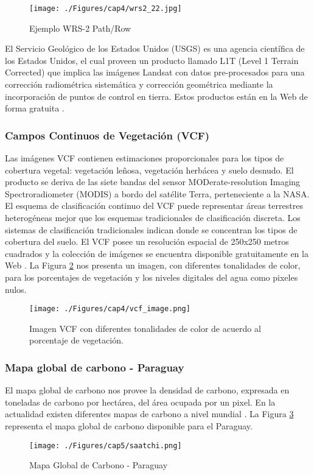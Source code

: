 \begin{figure}[H]
	\centering
	\texttt{[image: ./Figures/cap4/wrs2\_22.jpg]}
	\caption{Ejemplo WRS-2 Path/Row}
	\label{fig:wrs2Image}
\end{figure}

El Servicio Geol\'ogico de los Estados Unidos (USGS) es una agencia cient\'ifica de los Estados Unidos, el cual proveen un producto llamado L1T (Level 1 Terrain Corrected) que implica las im\'agenes Landsat con datos pre-procesados para una correcci\'on radiom\'etrica sistem\'atica y correcci\'on geom\'etrica mediante la incorporaci\'on de puntos de control en tierra. Estos productos est\'an en la Web de forma gratuita \cite{landsatNasa}.


\subsubsection{Campos Continuos de Vegetación (VCF)}\label{sec:vcf}
Las im\'agenes VCF contienen estimaciones proporcionales para los tipos de cobertura vegetal: vegetaci\'on le\~{n}osa, vegetaci\'on herb\'acea y suelo desnudo. El producto se deriva de las siete bandas del sensor MODerate-resolution Imaging Spectroradiometer (MODIS) a bordo del sat\'elite Terra, perteneciente a la NASA. El esquema de clasificaci\'on continuo del VCF puede representar \'areas terrestres heterog\'eneas mejor que los esquemas tradicionales de clasificaci\'on discreta. Los sistemas de clasificaci\'on tradicionales indican donde se concentran los tipos de cobertura del suelo. El VCF posee un resoluci\'on espacial de 250x250 metros cuadrados y la colecci\'on de im\'agenes se encuentra disponible gratuitamente en la Web \cite{gl2015Uni}.
La Figura \ref{fig:vcfImage} nos presenta un imagen, con diferentes tonalidades de color, para los porcentajes de vegetaci\'on y los niveles digitales del agua como pixeles nulos.
\begin{figure}[H]
	\centering
	\texttt{[image: ./Figures/cap4/vcf\_image.png]}
	\caption{Imagen VCF con diferentes tonalidades de color de acuerdo al porcentaje de vegetaci\'on.}
	\label{fig:vcfImage}
\end{figure}
\subsubsection{Mapa global de carbono - Paraguay}\label{sec:saatchiMapa}
El mapa global de carbono \cite{saatchi2011benchmark} nos provee la densidad de carbono, expresada en toneladas de carbono por hect\'area, del \'area ocupada por un pixel. En la actualidad existen diferentes mapas de carbono a nivel mundial \cite{saatchi2011benchmark}. La Figura \ref{fig:saatchi} representa el mapa global de carbono disponible para el Paraguay.
\begin{figure}[H]
	\centering
	\texttt{[image: ./Figures/cap5/saatchi.png]}
	\caption{Mapa Global de Carbono - Paraguay}
	\label{fig:saatchi}
\end{figure}


